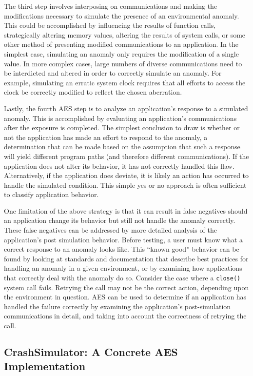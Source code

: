The third step
involves interposing on communications
and making the modifications necessary
to simulate the presence
of an environmental anomaly.
This could be accomplished by
influencing the results of function calls,
strategically altering memory values,
altering the results of system calls,
or some other method
of presenting modified communications to an application.
In the simplest case,
simulating an anomaly only requires
the modification of a single value.
In more complex cases,
large numbers of diverse communications
need to be interdicted and altered
in order to correctly simulate an anomaly.
For example,
simulating an erratic system clock
requires that all efforts
to access the clock
be correctly modified
to reflect the chosen aberration.

Lastly, the fourth AES step
is to analyze an application's response
to a simulated anomaly.
This is accomplished
by evaluating an application's communications
after the exposure is completed.
The simplest conclusion to draw
is whether or not the application
has made an effort to respond
to the anomaly,
a determination that can be made based
on the assumption
that such a response will yield
different program paths (and therefore different communications).
If the application
does not alter its behavior, it has not
correctly handled this flaw.
Alternatively,
if the application does deviate,
it is likely
an action has occurred to handle the simulated condition.
This simple yes or no approach
is often sufficient
to classify application behavior.

One limitation of the above strategy
is that it can result in false negatives
should an application change its behavior
but still not handle the anomaly correctly.
These false negatives can be addressed
by more detailed analysis
of the application's post simulation behavior.
Before testing,
a user must know
what a correct response
to an anomaly looks like.
This ``known good'' behavior can be found
by looking at standards and documentation
that describe best practices for handling an anomaly
in a given environment,
or by examining how applications that correctly
deal with the anomaly do so.
Consider the case where a {\tt close()} system call fails.
Retrying the call may not be the correct action,
depending upon the environment in question.
AES can be used to determine if an application
has handled the failure correctly
by examining the application's post-simulation communications in detail,
and taking into account the correctness of retrying the call.

\subsection{CrashSimulator: A Concrete AES Implementation}

